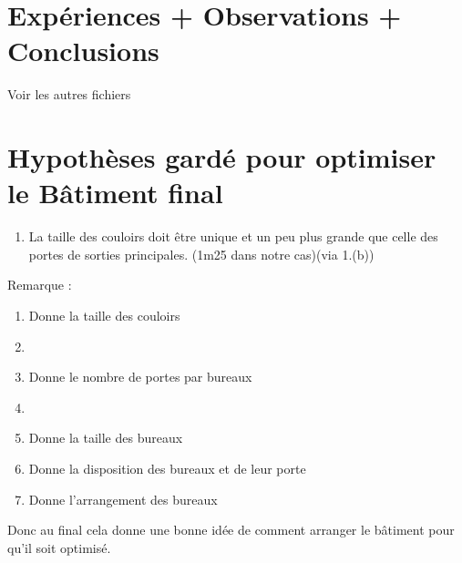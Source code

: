 \documentclass[12pt]{article}
\begin{document}
\section{Expériences + Observations + Conclusions}

Voir les autres fichiers

\section{Hypothèses gardé pour optimiser le Bâtiment final}

\begin{enumerate}
    \item La taille des couloirs doit être unique et un peu plus grande que celle des portes de sorties principales. (1m25 dans notre cas)(via 1.(b))
\newline\newline\end{enumerate}

Remarque :
\begin{enumerate}
    \item Donne la taille des couloirs
    \item 
    \item Donne le nombre de portes par bureaux
    \item 
    \item Donne la taille des bureaux
    \item Donne la disposition des bureaux et de leur porte
    \item Donne l'arrangement des bureaux
\newline\end{enumerate}

Donc au final cela donne une bonne idée de comment arranger le bâtiment pour qu'il soit optimisé.
\end{document}
